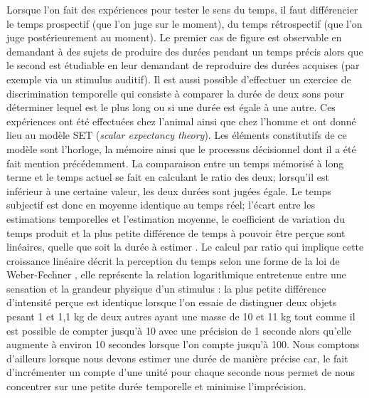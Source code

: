\documentclass[12pt,fleqn,oneside,french,openany]{book} %
\begin{document}
Lorsque l'on fait des expériences pour tester le sens du temps, il faut différencier le temps prospectif (que l'on juge sur le moment), du temps rétrospectif (que l'on juge postérieurement au moment). Le premier cas de figure est observable en demandant à des sujets de produire des durées pendant un temps précis alors que le second est étudiable en leur demandant de reproduire des durées acquises (par exemple via un stimulus auditif). Il est aussi possible d'effectuer un exercice de discrimination temporelle qui consiste à comparer la durée de deux sons pour déterminer lequel est le plus long ou si une durée est égale à une autre. Ces expériences ont été effectuées chez l'animal \cite{jasselette} ainsi que chez l'homme \cite{gibbon1984} et ont donné lieu au modèle SET (\emph{scalar expectancy theory}). Les éléments constitutifs de ce modèle sont l'horloge, la mémoire ainsi que le processus décisionnel dont il a été fait mention précédemment. La comparaison entre un temps mémorisé à long terme et le temps actuel se fait en calculant le ratio des deux; lorsqu'il est inférieur à une certaine valeur, les deux durées sont jugées égale. Le temps subjectif est donc en moyenne identique au temps réel; l'écart entre les estimations temporelles et l'estimation moyenne, le coefficient de variation du temps produit et la plus petite différence de temps à pouvoir être perçue sont linéaires, quelle que soit la durée à estimer \cite{set}. Le calcul par ratio qui implique cette croissance linéaire décrit la perception du temps selon une forme de la loi de Weber-Fechner \cite{gibbon1984,wearden1988}, elle représente la relation logarithmique entretenue entre une sensation et la grandeur physique d'un stimulus : la plus petite différence d'intensité perçue est identique lorsque l'on essaie de distinguer deux objets pesant 1 et 1,1 kg de deux autres ayant une masse de 10 et 11 kg \cite{weber} tout comme il est possible de compter jusqu'à 10 avec une précision de 1 seconde alors qu'elle augmente à environ 10 secondes lorsque l'on compte jusqu'à 100. Nous comptons d'ailleurs lorsque nous devons estimer une durée de manière précise car, le fait d'incrémenter un compte d'une unité pour chaque seconde nous permet de nous concentrer sur une petite durée temporelle et minimise l'imprécision.

\begin{figure}[h]
\end{figure}
\end{document}
